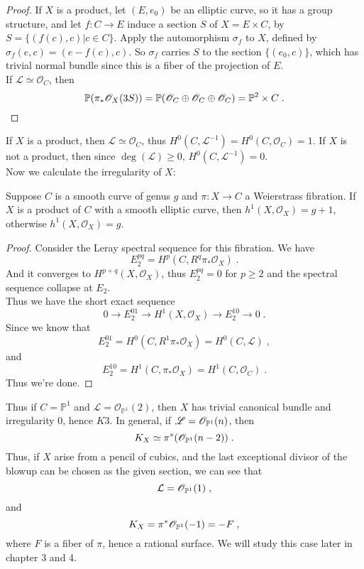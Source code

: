\begin{proof}
If $X$ is a product, let $(E,e_0)$ be an elliptic curve, so it has a group structure, and let $f\colon C\rightarrow E$ induce a section $S$ of $X=E\times C$, by $S=\{(f(c), c)|c\in C \}$. Apply the automorphism $\sigma_f$ to $X$, defined by $\sigma_f(e,c)=(e-f(c),c)$. So $\sigma_f$ carries $S$ to the section $\{(e_0,c)\}$, which has trivial normal bundle since this is a fiber of the projection of $E$.\\ \indent
If $\mathscr{L}\simeq \mathscr{O}_C$, then 
$$\mathbb{P}(\pi_*\mathscr{O}_X(3S))=\mathbb{P}(\mathscr{O}_C\oplus\mathscr{O}_C\oplus\mathscr{O}_C)=\mathbb{P}^2\times C\; .$$
\end{proof}
If $X$ is a product, then $\mathscr{L}\simeq \mathscr{O}_C$, thus $H^0(C,\mathscr{L}^{-1})=H^0(C,\mathscr{O}_C)=1$. If $X$ is not a product, then since $\deg(\mathscr{L})\geq 0$, $H^0(C,\mathscr{L}^{-1})=0$.\\ \indent
Now we calculate the irregularity of $X$:
\begin{prop}
Suppose $C$ is a smooth curve of genus $g$ and $\pi:X\rightarrow C$ a Weierstrass fibration. If $X$ is a product of $C$ with a smooth elliptic curve, then $h^1(X,\mathscr{O}_X)=g+1$, otherwise $h^1(X,\mathscr{O}_X)=g$.
\end{prop}
\begin{proof}
Consider the Leray spectral sequence for this fibration. We have $$E^{pq}_2=H^p(C,R^q\pi_*\mathscr{O}_X)\; .$$
\indent And it converges to $H^{p+q}(X,\mathscr{O}_X)$, thus $E_2^{pq}=0$ for $p\geq 2$ and the spectral sequence collapse at $E_2$.\\ \indent
Thus we have the short exact sequence
$$0\rightarrow E_2^{01}\rightarrow H^1(X,\mathscr{O}_X)\rightarrow E_2^{10}\rightarrow 0\; .$$
\indent Since we know that $$E_2^{01}=H^0(C,R^1\pi_*\mathscr{O}_X)=H^0(C,\mathscr{L})\; ,$$
\indent  and
$$E_2^{10}=H^1(C,\pi_*\mathscr{O}_X)=H^1(C,\mathscr{O}_C)\;.$$
\indent  Thus we're done.
\end{proof}
Thus if $C=\mathbb{P}^1$ and $\mathscr{L}=\mathscr{O}_{\mathbb{P}^1}(2)$, then $X$ has trivial canonical bundle and irregularity 0, hence $K3$. In general, if $\mathscr{L}=\mathscr{O}_{\mathbb{P}^1}(n)$, then $$K_X\simeq \pi^*(\mathscr{O}_{\mathbb{P}^1}(n-2))\; .$$
\indent Thus, if $X$ arise from a pencil of cubics, and the last exceptional divisor of the blowup can be chosen as the given section, we can see that 
$$\mathcal{L}=\mathscr{O}_{\mathbb{P}^1}(1)\; ,$$
and
$$K_X=\pi^*\mathscr{O}_{\mathbb{P}^1}(-1)=-F\; ,$$
where $F$ is a fiber of $\pi$, hence a rational surface. We will study this case later in chapter 3 and 4.
